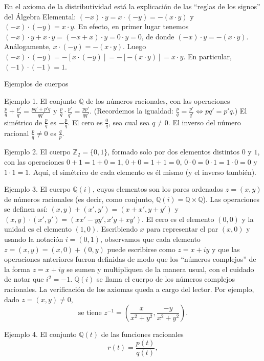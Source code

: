 \documentclass[12pt,oneside]{book}
\begin{document}
En el axioma de la distributividad está la explicación de las “reglas de los signos” del Álgebra Elemental: \((-x) \cdot y = x \cdot (-y) = -(x \cdot y)\) y \((-x) \cdot (-y) = x \cdot y\). En efecto, en primer lugar tenemos \((-x) \cdot y + x \cdot y = (-x + x) \cdot y = 0 \cdot y = 0\), de donde \((-x) \cdot y = -(x \cdot y)\). Análogamente, \(x \cdot (-y) = -(x \cdot y)\). Luego \((-x) \cdot (-y) = -[x \cdot (-y)] = -[-(x \cdot y)] = x \cdot y\). En particular, \((-1) \cdot (-1) = 1\).

Ejemplos de cuerpos

Ejemplo 1. El conjunto \(\mathbb{Q}\) de los números racionales, con las operaciones  
\(\frac{p}{q} + \frac{p'}{q'} = \frac{pq' + p'q}{qq'}\) y \(\frac{p}{q} \cdot \frac{p'}{q'} = \frac{pp'}{qq'}\). (Recordemos la igualdad: \(\frac{p}{q} = \frac{p'}{q'} \Leftrightarrow pq' = p'q\).) El simétrico de \(\frac{p}{q}\) es \(-\frac{p}{q}\). El cero es \(\frac{0}{q}\), sea cual sea \(q \neq 0\). El inverso del número racional \(\frac{p}{q} \neq 0\) es \(\frac{q}{p}\).

Ejemplo 2. El cuerpo \(\mathbb{Z}_2 = \{0, 1\}\), formado solo por dos elementos distintos \(0\) y \(1\), con las operaciones  
\(0 + 1 = 1 + 0 = 1\), \(0 + 0 = 1 + 1 = 0\),  
\(0 \cdot 0 = 0 \cdot 1 = 1 \cdot 0 = 0\) y \(1 \cdot 1 = 1\).  
Aquí, el simétrico de cada elemento es él mismo (y el inverso también).

Ejemplo 3. El cuerpo \(\mathbb{Q}(i)\), cuyos elementos son los pares ordenados \(z = (x, y)\) de números racionales (es decir, como conjunto, \(\mathbb{Q}(i) = \mathbb{Q} \times \mathbb{Q}\)). Las operaciones se definen así:  
\((x, y) + (x', y') = (x + x', y + y')\) y  
\((x, y) \cdot (x', y') = (xx' - yy', x'y + xy')\).  
El cero es el elemento \((0, 0)\) y la unidad es el elemento \((1, 0)\). Escribiendo \(x\) para representar el par \((x, 0)\) y usando la notación \(i = (0, 1)\), observamos que cada elemento \(z = (x, y) = (x, 0) + (0, y)\) puede escribirse como \(z = x + iy\) y que las operaciones anteriores fueron definidas de modo que los “números complejos” de la forma \(z = x + iy\) se sumen y multipliquen de la manera usual, con el cuidado de notar que \(i^2 = -1\). \(\mathbb{Q}(i)\) se llama el cuerpo de los números complejos racionales. La verificación de los axiomas queda a cargo del lector. Por ejemplo, dado \(z = (x, y) \neq 0\),
\[
\text{se tiene } z^{-1} = \left( \frac{x}{x^2 + y^2}, \frac{-y}{x^2 + y^2} \right).
\]

Ejemplo 4. El conjunto \(\mathbb{Q}(t)\) de las funciones racionales
\[
r(t) = \frac{p(t)}{q(t)},
\]
\end{document}
